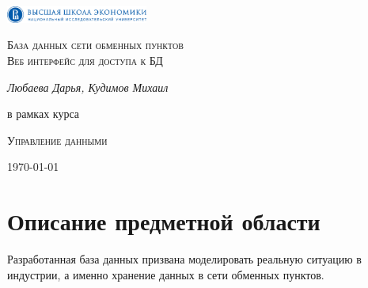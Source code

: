 \documentclass{article}
\date{2019\\ Март}
\author{Любаева Дарья
\and Кудимов Михаил}
\begin{document}
\begin{titlepage}
	\centering
	\includegraphics[width=0.35\textwidth]{logo}\par\vspace{1cm}
	\vspace{1cm}
	{\scshape\Large База данных сети обменных пунктов \\ Веб интерфейс для доступа к БД \par}
	\vspace{1.5cm}
	{\Large\itshape Любаева Дарья, Кудимов Михаил\par}
	\vfill
	в рамках курса\par
	\textsc{Управление данными}

	\vfill

	{\large \today\par}
\end{titlepage}

\section{Описание предметной области}

Разработанная база данных призвана моделировать реальную ситуацию в индустрии, а именно хранение данных в сети обменных пунктов.\\
\end{document}
